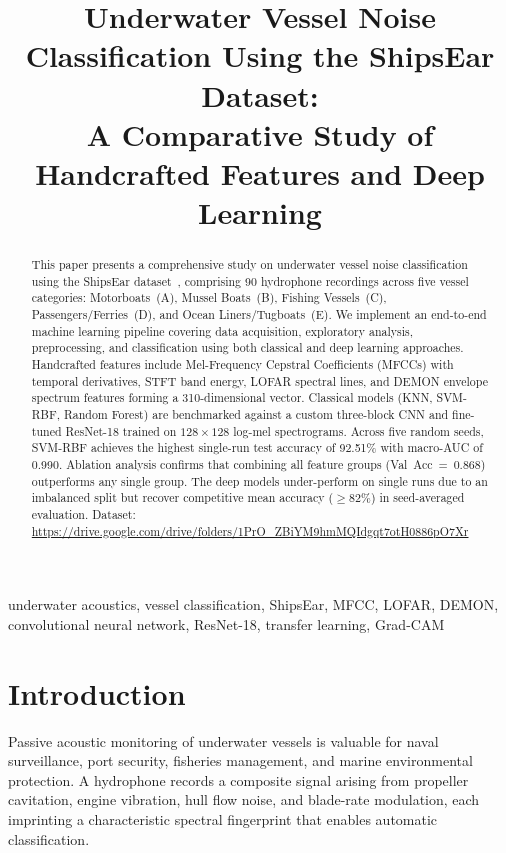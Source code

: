 \documentclass[conference]{IEEEtran}
\title{Underwater Vessel Noise Classification Using the ShipsEar Dataset:\\
A Comparative Study of Handcrafted Features and Deep Learning}
\author{
  \IEEEauthorblockN{Somya Pratap Singh}
}
\begin{document}
\maketitle

\begin{abstract}
This paper presents a comprehensive study on underwater vessel noise
classification using the ShipsEar dataset~\cite{shipsear2016}, comprising
90 hydrophone recordings across five vessel categories: Motorboats~(A),
Mussel Boats~(B), Fishing Vessels~(C), Passengers/Ferries~(D), and Ocean
Liners/Tugboats~(E). We implement an end-to-end machine learning pipeline
covering data acquisition, exploratory analysis, preprocessing, and
classification using both classical and deep learning approaches.
Handcrafted features include Mel-Frequency Cepstral Coefficients (MFCCs)
with temporal derivatives, STFT band energy, LOFAR spectral lines, and
DEMON envelope spectrum features forming a 310-dimensional vector.
Classical models (KNN, SVM-RBF, Random Forest) are benchmarked against a
custom three-block CNN and fine-tuned ResNet-18 trained on $128{\times}128$
log-mel spectrograms.
Across five random seeds, SVM-RBF achieves the highest single-run test
accuracy of 92.51\% with macro-AUC of 0.990. Ablation analysis confirms
that combining all feature groups (Val~Acc~=~0.868) outperforms any single
group. The deep models under-perform on single runs due to an imbalanced
split but recover competitive mean accuracy ($\geq$82\%) in seed-averaged
evaluation. Dataset:
\url{https://drive.google.com/drive/folders/1PrO_ZBiYM9hmMQIdgqt7otH0886pO7Xr}
\end{abstract}

\begin{IEEEkeywords}
underwater acoustics, vessel classification, ShipsEar, MFCC, LOFAR, DEMON,
convolutional neural network, ResNet-18, transfer learning, Grad-CAM
\end{IEEEkeywords}

\section{Introduction}

Passive acoustic monitoring of underwater vessels is valuable for naval
surveillance, port security, fisheries management, and marine environmental
protection. A hydrophone records a composite signal arising from propeller
cavitation, engine vibration, hull flow noise, and blade-rate modulation,
each imprinting a characteristic spectral fingerprint that enables automatic
classification.
\end{document}
